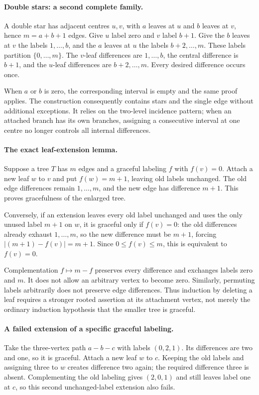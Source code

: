 \documentclass[11pt,a4paper]{article}
\begin{document}
\paragraph{Double stars: a second complete family.}
A double star has adjacent centres $u,v$, with $a$ leaves at $u$ and $b$ leaves at $v$, hence $m=a+b+1$ edges. Give $u$ label zero and $v$ label $b+1$. Give the $b$ leaves at $v$ the labels $1,\ldots,b$, and the $a$ leaves at $u$ the labels $b+2,\ldots,m$. These labels partition $\{0,\ldots,m\}$. The $v$-leaf differences are $1,\ldots,b$, the central difference is $b+1$, and the $u$-leaf differences are $b+2,\ldots,m$. Every desired difference occurs once.

When $a$ or $b$ is zero, the corresponding interval is empty and the same proof applies. The construction consequently contains stars and the single edge without additional exceptions. It relies on the two-level incidence pattern; when an attached branch has its own branches, assigning a consecutive interval at one centre no longer controls all internal differences.

\paragraph{The exact leaf-extension lemma.}
Suppose a tree $T$ has $m$ edges and a graceful labeling $f$ with $f(v)=0$. Attach a new leaf $w$ to $v$ and put $f(w)=m+1$, leaving old labels unchanged. The old edge differences remain $1,\ldots,m$, and the new edge has difference $m+1$. This proves gracefulness of the enlarged tree.

Conversely, if an extension leaves every old label unchanged and uses the only unused label $m+1$ on $w$, it is graceful only if $f(v)=0$: the old differences already exhaust $1,\ldots,m$, so the new difference must be $m+1$, forcing $|(m+1)-f(v)|=m+1$. Since $0\le f(v)\le m$, this is equivalent to $f(v)=0$.

Complementation $f\mapsto m-f$ preserves every difference and exchanges labels zero and $m$. It does not allow an arbitrary vertex to become zero. Similarly, permuting labels arbitrarily does not preserve edge differences. Thus induction by deleting a leaf requires a stronger rooted assertion at its attachment vertex, not merely the ordinary induction hypothesis that the smaller tree is graceful.

\paragraph{A failed extension of a specific graceful labeling.}
Take the three-vertex path $a-b-c$ with labels $(0,2,1)$. Its differences are two and one, so it is graceful. Attach a new leaf $w$ to $c$. Keeping the old labels and assigning three to $w$ creates difference two again; the required difference three is absent. Complementing the old labeling gives $(2,0,1)$ and still leaves label one at $c$, so this second unchanged-label extension also fails.
\end{document}
